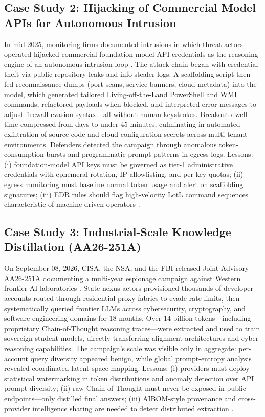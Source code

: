 \documentclass[conference,10pt,twocolumn,a4paper]{IEEEtran}
\begin{document}
\subsection{Case Study 2: Hijacking of Commercial Model APIs for Autonomous Intrusion}
In mid-2025, monitoring firms documented intrusions in which threat actors operated hijacked commercial foundation-model API credentials as the reasoning engine of an autonomous intrusion loop \cite{fang2024llm, crowdstrike_gtr_2025}. The attack chain began with credential theft via public repository leaks and info-stealer logs. A scaffolding script then fed reconnaissance dumps (port scans, service banners, cloud metadata) into the model, which generated tailored Living-off-the-Land PowerShell and WMI commands, refactored payloads when blocked, and interpreted error messages to adjust firewall-evasion syntax---all without human keystrokes. Breakout dwell time compressed from days to under 45 minutes, culminating in automated exfiltration of source code and cloud configuration secrets across multi-tenant environments. Defenders detected the campaign through anomalous token-consumption bursts and programmatic prompt patterns in egress logs. Lessons: (i) foundation-model API keys must be governed as tier-1 administrative credentials with ephemeral rotation, IP allowlisting, and per-key quotas; (ii) egress monitoring must baseline normal token usage and alert on scaffolding signatures; (iii) EDR rules should flag high-velocity LotL command sequences characteristic of machine-driven operators \cite{cisa_agentic_ai_2026}.

\subsection{Case Study 3: Industrial-Scale Knowledge Distillation (AA26-251A)}
On September 08, 2026, CISA, the NSA, and the FBI released Joint Advisory AA26-251A documenting a multi-year espionage campaign against Western frontier AI laboratories \cite{cisa_aa26_251a, cisa_aa26_251a_distillation}. State-nexus actors provisioned thousands of developer accounts routed through residential proxy fabrics to evade rate limits, then systematically queried frontier LLMs across cybersecurity, cryptography, and software-engineering domains for 18 months. Over 14 billion tokens---including proprietary Chain-of-Thought reasoning traces---were extracted and used to train sovereign student models, directly transferring alignment architectures and cyber-reasoning capabilities. The campaign's scale was visible only in aggregate: per-account query diversity appeared benign, while global prompt-entropy analysis revealed coordinated latent-space mapping. Lessons: (i) providers must deploy statistical watermarking in token distributions and anomaly detection over API prompt diversity; (ii) raw Chain-of-Thought must never be exposed in public endpoints---only distilled final answers; (iii) AIBOM-style provenance and cross-provider intelligence sharing are needed to detect distributed extraction \cite{carlini2021extracting}.
\end{document}
